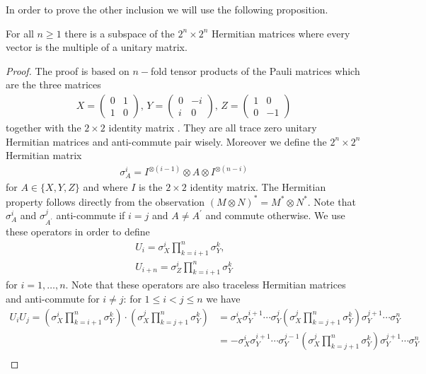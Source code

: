 \noindent In order to prove the other inclusion we will use the following proposition. 
\begin{prop} \label{PauliProp}
For all $ n \ge 1 $ there is a subspace of the $ 2^n \times 2^n $ Hermitian matrices where every vector is the multiple of a unitary matrix. 
\end{prop}
\begin{proof}
The proof is based on $ n- $fold tensor products of the Pauli matrices which are the three matrices 
\begin{align*}
X = \begin{pmatrix}
0 & 1 \\ 1 & 0
\end{pmatrix}, \, Y = \begin{pmatrix}
0 & -i \\ i & 0
\end{pmatrix}, \, Z = \begin{pmatrix}
1 & 0 \\ 0 & -1
\end{pmatrix}
\end{align*}
together with the $ 2 \times 2 $ identity matrix .
They are all trace zero unitary Hermitian matrices and anti-commute pair wisely. 
Moreover we define the $ 2^n \times 2^n $ Hermitian matrix 
\begin{align*}
\sigma_A^i = I^{\otimes (i-1)} \otimes A \otimes I^{\otimes (n-i)}
\end{align*}
for $ A \in \{ X,Y,Z \}$ and where $ I $ is the $ 2 \times 2 $ identity matrix. The Hermitian property follows directly from the observation $ (M \otimes N)^* = M^* \otimes N^* $.
Note that $ \sigma_A^i $ and $ \sigma_{A^{\prime}}^j $ anti-commute if $ i = j $ and $ A \neq A^{\prime} $ and commute otherwise. We use these operators in order to define 
\begin{align*}
U_i = \sigma_X^i \prod_{k = i+1}^{n}\sigma_Y^k, \\
U_{i+n} = \sigma_Z^i \prod_{k = i+1}^n \sigma_Y^k
\end{align*}
for $ i = 1,\hdots,n $. Note that these operators are also traceless Hermitian matrices and anti-commute for $ i \neq j $:    
for $ 1 \le i < j  \le n$ we have 
\begin{align*}
U_iU_j = (\sigma_X^i \prod_{k = i+1}^{n}\sigma_Y^k) \cdot( \sigma_X^j \prod_{k = j+1}^{n}\sigma_Y^k) &= \sigma_X^i \sigma_Y^{i+1} \cdots \sigma_Y^j ( \sigma_X^j \prod_{k = j+1}^{n}\sigma_Y^k) \sigma_Y^{j+1} \cdots \sigma_Y^n \\
&= - \sigma_X^i \sigma_Y^{i+1} \cdots \sigma_Y^{j-1} ( \sigma_X^j \prod_{k = j+1}^{n}\sigma_Y^k) \sigma_Y^{j+1} \cdots \sigma_Y^n  \\

\end{align*}
\end{proof}
